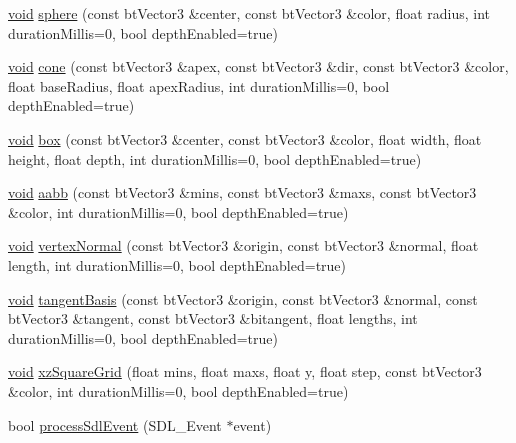 \begin{DoxyCompactItemize}
\item 
\mbox{\hyperlink{_thread_8h_af1e856da2e658414cb2456cb6f7ebc66}{void}} \mbox{\hyperlink{classnjli_1_1_world_debug_drawer_af5b08f142be7d2061437d20bfdfb12a4}{sphere}} (const bt\+Vector3 \&center, const bt\+Vector3 \&color, float radius, int duration\+Millis=0, bool depth\+Enabled=true)
\item 
\mbox{\hyperlink{_thread_8h_af1e856da2e658414cb2456cb6f7ebc66}{void}} \mbox{\hyperlink{classnjli_1_1_world_debug_drawer_a3e6834506d31a8111699f184ef75c6ad}{cone}} (const bt\+Vector3 \&apex, const bt\+Vector3 \&dir, const bt\+Vector3 \&color, float base\+Radius, float apex\+Radius, int duration\+Millis=0, bool depth\+Enabled=true)
\item 
\mbox{\hyperlink{_thread_8h_af1e856da2e658414cb2456cb6f7ebc66}{void}} \mbox{\hyperlink{classnjli_1_1_world_debug_drawer_ac47f08694cdd1b36a2b0a89238ef9927}{box}} (const bt\+Vector3 \&center, const bt\+Vector3 \&color, float width, float height, float depth, int duration\+Millis=0, bool depth\+Enabled=true)
\item 
\mbox{\hyperlink{_thread_8h_af1e856da2e658414cb2456cb6f7ebc66}{void}} \mbox{\hyperlink{classnjli_1_1_world_debug_drawer_ae4c968319278e639f0372948fdf16729}{aabb}} (const bt\+Vector3 \&mins, const bt\+Vector3 \&maxs, const bt\+Vector3 \&color, int duration\+Millis=0, bool depth\+Enabled=true)
\item 
\mbox{\hyperlink{_thread_8h_af1e856da2e658414cb2456cb6f7ebc66}{void}} \mbox{\hyperlink{classnjli_1_1_world_debug_drawer_a36d81cb34d46d4e853a44e3477dba202}{vertex\+Normal}} (const bt\+Vector3 \&origin, const bt\+Vector3 \&normal, float length, int duration\+Millis=0, bool depth\+Enabled=true)
\item 
\mbox{\hyperlink{_thread_8h_af1e856da2e658414cb2456cb6f7ebc66}{void}} \mbox{\hyperlink{classnjli_1_1_world_debug_drawer_a3e46b0af228eb9e8f112ad7e6d8007f0}{tangent\+Basis}} (const bt\+Vector3 \&origin, const bt\+Vector3 \&normal, const bt\+Vector3 \&tangent, const bt\+Vector3 \&bitangent, float lengths, int duration\+Millis=0, bool depth\+Enabled=true)
\item 
\mbox{\hyperlink{_thread_8h_af1e856da2e658414cb2456cb6f7ebc66}{void}} \mbox{\hyperlink{classnjli_1_1_world_debug_drawer_a42fda06cd30581136e0e39f6682b71bd}{xz\+Square\+Grid}} (float mins, float maxs, float y, float step, const bt\+Vector3 \&color, int duration\+Millis=0, bool depth\+Enabled=true)
\item 
bool \mbox{\hyperlink{classnjli_1_1_world_debug_drawer_a6472cecf79ae2d4b76fcb5e363019fbd}{process\+Sdl\+Event}} (S\+D\+L\+\_\+\+Event $\ast$event)
\end{DoxyCompactItemize}

